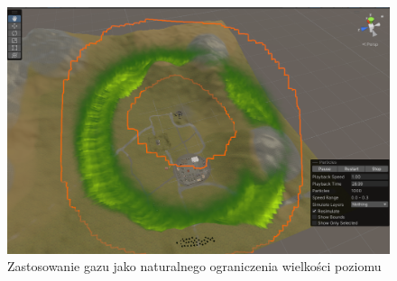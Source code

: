 \begin{figure}[h]
        \centering
        \includegraphics[width=1\linewidth]{Images/gas.png}
        \caption{Zastosowanie gazu jako naturalnego ograniczenia wielkości poziomu}
\end{figure}

